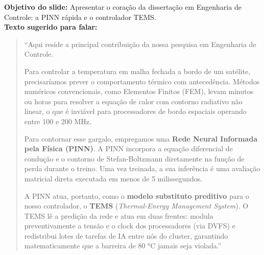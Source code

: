 \documentclass[11pt,a4paper]{article}
\begin{document}
\begin{tcolorbox}[colback=speechbg, colframe=bordergreen, title=\color{ifesdark}\textbf{SLIDE 5: A SOLUÇÃO: PREDITOR PINN E CONTROLE TEMS \hfill TEMPO: 4:15 -- 6:00 (Duração: 105 segundos)}]
\small
\textbf{Objetivo do slide:} Apresentar o coração da dissertação em Engenharia de Controle: a PINN rápida e o controlador TEMS.\\
\textbf{Texto sugerido para falar:}
\begin{quote}
``Aqui reside a principal contribuição da nossa pesquisa em Engenharia de Controle. 

Para controlar a temperatura em malha fechada a bordo de um satélite, precisaríamos prever o comportamento térmico com antecedência. Métodos numéricos convencionais, como Elementos Finitos (FEM), levam minutos ou horas para resolver a equação de calor com contorno radiativo não linear, o que é inviável para processadores de bordo espaciais operando entre 100 e 200 MHz.

Para contornar esse gargalo, empregamos uma \textbf{Rede Neural Informada pela Física (PINN)}. A PINN incorpora a equação diferencial de condução e o contorno de Stefan-Boltzmann diretamente na função de perda durante o treino. Uma vez treinada, a sua inferência é uma avaliação matricial direta executada em menos de 5 milissegundos.

A PINN atua, portanto, como o \textbf{modelo substituto preditivo} para o nosso controlador, o \textbf{TEMS} (\textit{Thermal-Energy Management System}). O TEMS lê a predição da rede e atua em duas frentes: modula preventivamente a tensão e o clock dos processadores (via DVFS) e redistribui lotes de tarefas de IA entre nós do cluster, garantindo matematicamente que a barreira de 80 °C jamais seja violada.''
\end{quote}
\end{tcolorbox}

\vspace{6pt}
\end{document}
